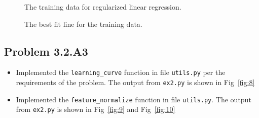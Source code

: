 \documentclass{article}
\begin{document}
\begin{figure}[h]
  \caption{The training data for regularized linear regression.}\label{fig:6}
\end{figure}

\begin{figure}[h]
  \caption{The best fit line for the training data.}\label{fig:7}
\end{figure}

\subsection{Problem 3.2.A3}
\begin{itemize}
\item Implemented the \verb|learning_curve| function in file \verb|utils.py| per the requirements of the problem. The output from
  \verb|ex2.py| is shown in Fig~\ref{fig:8}
\item Implemented the \verb|feature_normalize| function in file \verb|utils.py|. The output from \verb|ex2.py| is shown in
  Fig~\ref{fig:9} and Fig~\ref{fig:10}
\end{itemize}
\end{document}
